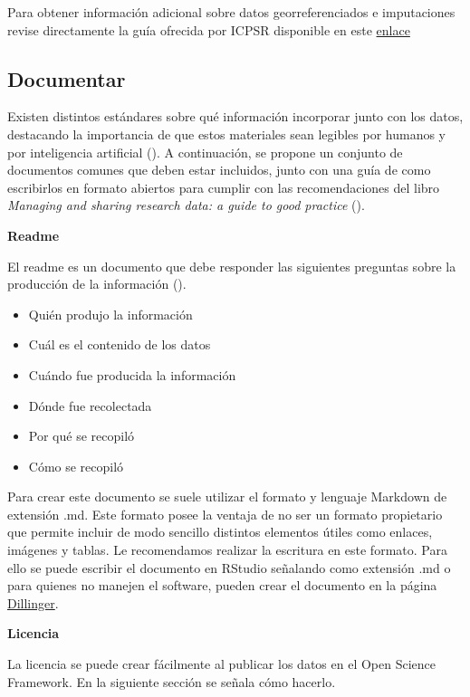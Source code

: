\documentclass[
  spanish,
  a4paper,
  oneside]{scrbook}
\begin{document}
Para obtener información adicional sobre datos georreferenciados e
imputaciones revise directamente la guía ofrecida por ICPSR disponible
en este
\href{https://www.icpsr.umich.edu/files/deposit/dataprep.pdf}{enlace}

\subsection{\texorpdfstring{\textbf{Documentar}}{Documentar}}\label{documentar}

Existen distintos estándares sobre qué información incorporar junto con
los datos, destacando la importancia de que estos materiales sean
legibles por humanos y por inteligencia artificial
(). A continuación, se propone
un conjunto de documentos comunes que deben estar incluidos, junto con
una guía de como escribirlos en formato abiertos para cumplir con las
recomendaciones del libro \emph{Managing and sharing research data: a
guide to good practice} ().

\textbf{Readme}

El readme es un documento que debe responder las siguientes preguntas
sobre la producción de la información
().

\begin{itemize}
\item
  Quién produjo la información
\item
  Cuál es el contenido de los datos
\item
  Cuándo fue producida la información
\item
  Dónde fue recolectada
\item
  Por qué se recopiló
\item
  Cómo se recopiló
\end{itemize}

Para crear este documento se suele utilizar el formato y lenguaje
Markdown de extensión .md. Este formato posee la ventaja de no ser un
formato propietario que permite incluir de modo sencillo distintos
elementos útiles como enlaces, imágenes y tablas. Le recomendamos
realizar la escritura en este formato. Para ello se puede escribir el
documento en RStudio señalando como extensión .md o para quienes no
manejen el software, pueden crear el documento en la página
\href{https://dillinger.io/}{Dillinger}.

\textbf{Licencia}

La licencia se puede crear fácilmente al publicar los datos en el Open
Science Framework. En la siguiente sección se señala cómo hacerlo.
\end{document}
